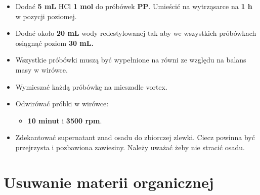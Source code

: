 \documentclass[
  letterpaper,
  DIV=11,
  numbers=noendperiod]{scrreprt}
\providecommand{\tightlist}{%
  \setlength{\itemsep}{0pt}\setlength{\parskip}{0pt}}\usepackage{longtable,booktabs,array}
\begin{document}
\begin{itemize}
\tightlist
\item
  Dodać \textbf{5 mL} HCl \textbf{1 mol} do próbówek \textbf{PP}.
  Umieścić na wytrząsarce na \textbf{1 h} w pozycji poziomej.
\item
  Dodać około \textbf{20 mL} wody redestylowanej tak aby we wszystkich
  próbówkach osiągnąć poziom \textbf{30 mL.}
\item
  Wszystkie próbówki muszą być wypełnione na równi ze względu na balans
  masy w wirówce.
\item
  Wymieszać każdą próbówkę na mieszadle vortex.
\item
  Odwirówać próbki w wirówce:

  \begin{itemize}
  \tightlist
  \item
    \textbf{10 minut} i \textbf{3500 rpm}.
  \end{itemize}
\item
  Zdekantować supernatant znad osadu do zbiorczej zlewki. Ciecz powinna
  być przejrzysta i pozbawiona zawiesiny. Należy uważać żeby nie stracić
  osadu.
\end{itemize}

\hypertarget{usuwanie-materii-organicznej}{%
\section{Usuwanie materii
organicznej}\label{usuwanie-materii-organicznej}}
\end{document}

